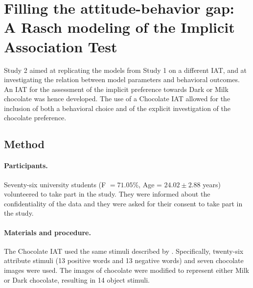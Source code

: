 \documentclass[12pt]{book}
\begin{document}
\section[Filling the Gap]{Filling the attitude-behavior gap: A Rasch modeling of the Implicit Association Test}\label{sec:filling}
Study 2 aimed at replicating the models from Study 1 on a different IAT, and at investigating the relation between model parameters and behavioral outcomes. An IAT for the assessment of the implicit preference towards Dark or Milk chocolate was hence developed. The use of a Chocolate IAT allowed for the inclusion of both a behavioral choice and of the explicit investigation of the chocolate preference. 

\subsection{Method}

\paragraph{Participants.}
Seventy-six university students (F $=71.05$\%, Age = $24.02\pm2.88$ years) volunteered to take part in the study. 
They were informed about the confidentiality of the data and they were asked for their consent to take part in the study. 

\paragraph{Materials and procedure.}
The Chocolate IAT used the same stimuli described by . Specifically, twenty-six attribute stimuli (13 positive words and 13 negative words) and seven chocolate images were used. The images of chocolate were modified to represent either Milk or Dark chocolate, resulting in 14 object stimuli.

\end{document}
